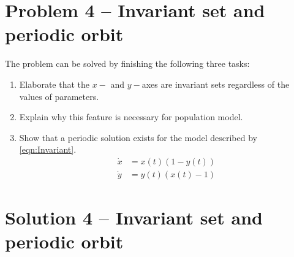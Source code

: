 \documentclass[a4paper,twocolumn]{article} %
\begin{document}
\section*{Problem 4 -- Invariant set and periodic orbit}
\label{sec:pro4}

The problem can be solved by finishing the following three tasks:
\begin{enumerate}
  \item Elaborate that the $x-$ and $y-$axes are invariant sets regardless of the values of parameters.
  \item Explain why this feature is necessary for population model.
  \item Show that a periodic solution exists for the model described by \eqref{eqn:Invariant}.
  \begin{subequations}\label{eqn:Invariant}
\begin{align} 
\dot{x}&=x(t)(1-y(t))\label{eqn:Invariant1}\\
\dot{y}&=y(t)(x(t)-1)\label{eqn:Invariant2}
\end{align}
\end{subequations}
\end{enumerate}

\section*{Solution 4 -- Invariant set and periodic orbit}
\label{sec:sol4}
\end{document}
